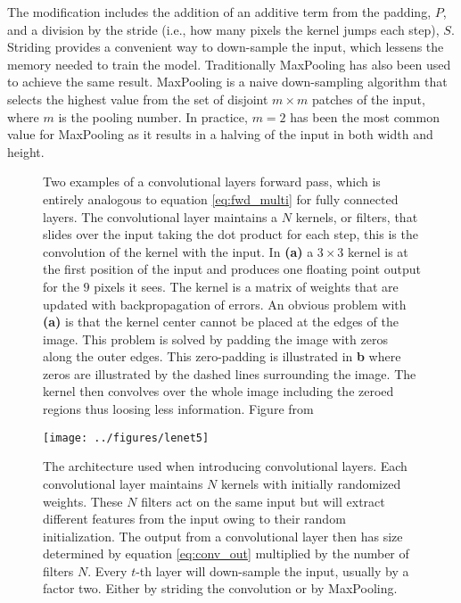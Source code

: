 \noindent The modification includes the addition of an additive term from the padding, $P$, and a division by the stride (i.e., how many pixels the kernel jumps each step), $S$. Striding provides a convenient way to down-sample the input, which lessens the memory needed to train the model. Traditionally MaxPooling has also been used to achieve the same result. MaxPooling is a naive down-sampling algorithm that selects the highest value from the set of disjoint $m\times m$ patches of the input, where $m$ is the pooling number. In practice, $m=2$ has been the most common value for MaxPooling as it results in a halving of the input in both width and height.

\begin{figure}
\centering
{}
\caption[Convolutional layer illustration]{Two examples of a convolutional layers forward pass, which is entirely analogous to equation \ref{eq:fwd_multi} for fully connected layers. The convolutional layer maintains a $N$ kernels, or filters, that slides over the input taking the dot product for each step, this is the convolution of the kernel with the input. In \textbf{(a)} a $3\times3$ kernel is at the first position of the input and produces one floating point output for the $9$ pixels it sees. The kernel is a matrix of weights that are updated with backpropagation of errors. An obvious problem with \textbf{(a)} is that the kernel center cannot be placed at the edges of the image. This problem is solved by padding the image with zeros along the outer edges. This zero-padding is illustrated in \textbf{b} where zeros are illustrated by the dashed lines surrounding the image. The kernel then convolves over the whole image including the zeroed regions thus loosing less information. Figure from \citet{Dumoulin2016}}\label{fig:conv_aritmetic} 
\end{figure}

\begin{figure}
\centering
\texttt{[image: ../figures/lenet5]}
\caption[Original LeNet architecture]{The architecture \citet{Lecun1998} used when introducing convolutional layers. Each convolutional layer maintains $N$ kernels with initially randomized weights. These $N$ filters act on the same input but will extract different features from the input owing to their random initialization. The output from a convolutional layer then has size determined by equation \ref{eq:conv_out} multiplied by the number of filters $N$. Every $t$-th layer will down-sample the input, usually by a factor two. Either by striding the convolution or by MaxPooling.}\label{fig:lenet5}
\end{figure}

